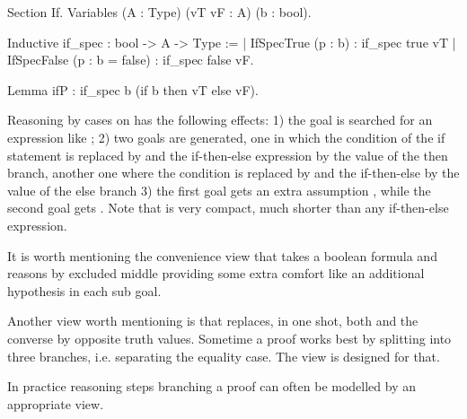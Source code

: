 \begin{coq}{}{}
Section If.
Variables (A : Type) (vT vF : A) (b : bool).

Inductive if_spec : bool -> A -> Type :=
| IfSpecTrue  (p : b)         : if_spec true vT
| IfSpecFalse (p : b = false) : if_spec false vF.

Lemma ifP : if_spec b (if b then vT else vF).
\end{coq}

Reasoning by cases on  has the following effects:
1) the goal is searched for an expression like ;
2) two goals are generated, one in which the condition of the if
statement is replaced by  and the if-then-else expression
by the value
of the then branch, another one where  the condition is replaced by
 and the if-then-else by the value of the else branch
3) the first goal gets an extra assumption , while
the second goal gets .
Note that  is very compact, much shorter than any if-then-else
expression.

It is worth mentioning the convenience view  that takes a boolean
formula and reasons by excluded middle providing some extra comfort
like an additional hypothesis in each sub goal.

Another view worth mentioning is  that replaces, in one shot,
both \C{(_ <= _)} and the converse \C{(_ < _)} by opposite truth values.
Sometime a proof works best by splitting into three branches, i.e.
separating the equality case. The  view is designed for that.

In practice reasoning steps branching a proof can often be modelled by an
appropriate view.





